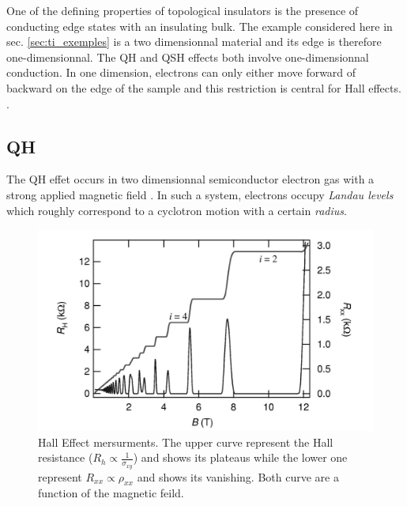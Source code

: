 One of the defining properties of topological insulators is the presence of conducting edge states with an insulating bulk. The example considered here in sec. \ref{sec:ti_exemples} is a two dimensionnal material and its edge is therefore one-dimensionnal. The QH and QSH effects both involve one-dimensionnal conduction. In one dimension, electrons can only either move forward of backward on the edge of the sample and this restriction is central for Hall effects. \cite{qi_quantum_2010}. 
\subsection{QH}
The QH effet occurs in two dimensionnal semiconductor electron gas with a strong applied magnetic field \cite{qi_quantum_2010}. In such a system, electrons occupy \textit{Landau levels} which roughly correspond to a cyclotron motion with a certain \textit{radius}.\cite{laughlin_quantized_1981}

\begin{figure}[h]
    \includegraphics[width=\columnwidth]{sections/visuel/Hall_effect.png}
    \caption{Hall Effect mersurments. The upper curve represent the Hall resistance ($R_h \propto \frac{1}{\sigma_{xy}}$) and shows its plateaus while the lower one represent $R_{xx} \propto \rho_{xx}$ and shows its vanishing. Both curve are a function of the magnetic feild. \cite{jeckelmann_quantum_nodate}}
    \label{fig:Hall_effet}
\end{figure}

